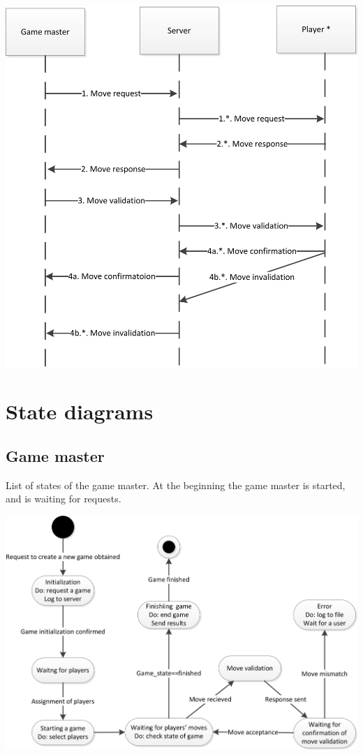 \documentclass{article}
\begin{document}
\includegraphics[scale=1.00]{UGS_events_master-server-player_interaction.jpg}


\pagebreak[4]


\section{State diagrams}



\subsection{Game master}
List of states of the game master. At the beginning the game master is started, and is waiting for requests.

\includegraphics[scale=1.10]{UGS_states_game_master.jpg}
\end{document}
